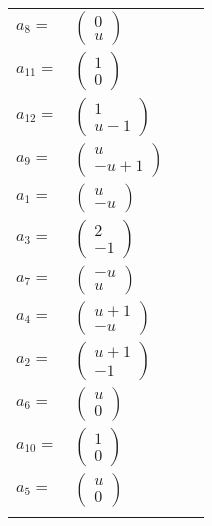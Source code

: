 \documentclass[1p]{elsarticle_modified}
\theoremstyle{definition}
\begin{document}
\begin{tabular}{m{7pt} m{180pt} m{7pt} m{180pt} }
\flushright $a_{8}=$&$\begin{pmatrix}0\\u\end{pmatrix}$ \\
\flushright $a_{11}=$&$\begin{pmatrix}1\\0\end{pmatrix}$ \\
\flushright $a_{12}=$&$\begin{pmatrix}1\\u-1\end{pmatrix}$ \\
\flushright $a_{9}=$&$\begin{pmatrix}u\\- u+1\end{pmatrix}$ \\
\flushright $a_{1}=$&$\begin{pmatrix}u\\- u\end{pmatrix}$ \\
\flushright $a_{3}=$&$\begin{pmatrix}2\\-1\end{pmatrix}$ \\
\flushright $a_{7}=$&$\begin{pmatrix}- u\\u\end{pmatrix}$ \\
\flushright $a_{4}=$&$\begin{pmatrix}u+1\\- u\end{pmatrix}$ \\
\flushright $a_{2}=$&$\begin{pmatrix}u+1\\-1\end{pmatrix}$ \\
\flushright $a_{6}=$&$\begin{pmatrix}u\\0\end{pmatrix}$ \\
\flushright $a_{10}=$&$\begin{pmatrix}1\\0\end{pmatrix}$ \\
\flushright $a_{5}=$&$\begin{pmatrix}u\\0\end{pmatrix}$\\&\end{tabular}
\end{document}
